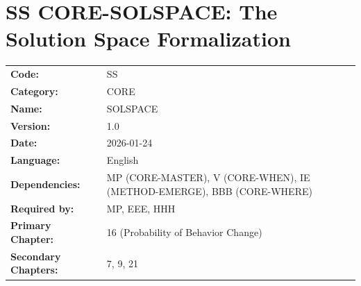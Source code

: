 %
%
%

\chapter{SS CORE-SOLSPACE: The Solution Space Formalization}
\label{app:core-ss}

\begin{tcolorbox}[colback=white, colframe=black!50, title=Appendix Information]
\begin{tabular}{ll}
\textbf{Code:} & SS \\
\textbf{Category:} & CORE \\
\textbf{Name:} & SOLSPACE \\
\textbf{Version:} & 1.0 \\
\textbf{Date:} & 2026-01-24 \\
\textbf{Language:} & English \\
\textbf{Dependencies:} & MP (CORE-MASTER), V (CORE-WHEN), IE (METHOD-EMERGE), BBB (CORE-WHERE) \\
\textbf{Required by:} & MP, EEE, HHH \\
\textbf{Primary Chapter:} & 16 (Probability of Behavior Change) \\
\textbf{Secondary Chapters:} & 7, 9, 21 \\
\end{tabular}
\end{tcolorbox}

